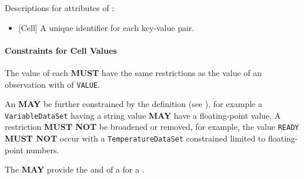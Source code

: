 Descriptions for attributes of :

\begin{itemize}

\item {}[Cell] \newline A unique identifier for each \gls{key-value pair}.
\end{itemize}

\paragraph{Constraints for Cell Values}\mbox{}
\label{sec:Constraints for Cell Values}

The value of each  \textbf{MUST} have the same restrictions as the value of an \gls{observation} with  of \texttt{VALUE}.

An  \textbf{MAY} be further constrained by the  definition (see ), for example a \texttt{VariableDataSet} having a string value \textbf{MAY} have a floating-point  value. A restriction \textbf{MUST NOT} be broadened or removed, for example, the value \texttt{READY} \textbf{MUST NOT} occur with a \texttt{TemperatureDataSet} constrained limited to floating-point numbers.

The    \textbf{MAY} provide the  and  of a  for a .
